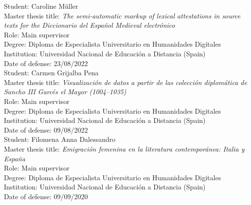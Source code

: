 \documentclass[11pt, a4paper]{article}
\newcommand{\ind}[1]{\textcolor{black!62!white}{\selectfont#1}}
\begin{document}
\ind{Student:} Caroline Müller\\
\ind{Master thesis title:} \textit{The semi-automatic markup of lexical attestations in source texts for the Diccionario del Español
Medieval electrónico}\\
\ind{Role:} Main supervisor\\
\ind{Degree:} Diploma de Especialista Universitario en Humanidades Digitales\\
\ind{Institution:} Universidad Nacional de Educación a Distancia (Spain)\\
\ind{Date of defense:} 23/08/2022\\


\ind{Student:} Carmen Grijalba Pena\\
\ind{Master thesis title:} \textit{Visualización de datos a partir de las colección diplomática de Sancho III Garcés el Mayor (1004--1035)}\\
\ind{Role:} Main supervisor\\
\ind{Degree:} Diploma de Especialista Universitario en Humanidades Digitales\\
\ind{Institution:} Universidad Nacional de Educación a Distancia (Spain)\\
\ind{Date of defense:} 09/08/2022\\


\ind{Student:} Filomena Anna Dalessandro\\
\ind{Master thesis title:} \textit{Emigración femenina en la literatura contemporánea: Italia y España}\\
\ind{Role:} Main supervisor\\
\ind{Degree:} Diploma de Especialista Universitario en Humanidades Digitales\\
\ind{Institution:} Universidad Nacional de Educación a Distancia (Spain)\\
\ind{Date of defense:} 09/09/2020
\end{document}
